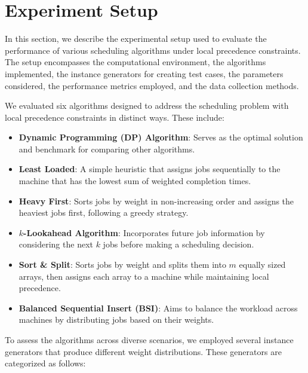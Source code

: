 \section{Experiment Setup} \label{sec:experiment_setup}

In this section, we describe the experimental setup used to evaluate the performance of various scheduling algorithms under local precedence constraints. The setup encompasses the computational environment, the algorithms implemented, the instance generators for creating test cases, the parameters considered, the performance metrics employed, and the data collection methods.

We evaluated six algorithms designed to address the scheduling problem with local precedence constraints in distinct ways. These include:

\begin{itemize}
    \item \textbf{Dynamic Programming (DP) Algorithm}: Serves as the optimal solution and benchmark for comparing other algorithms.
    \item \textbf{Least Loaded}: A simple heuristic that assigns jobs sequentially to the machine that has the lowest sum of weighted completion times.
    \item \textbf{Heavy First}: Sorts jobs by weight in non-increasing order and assigns the heaviest jobs first, following a greedy strategy.
    \item \textbf{$k$-Lookahead Algorithm}: Incorporates future job information by considering the next $k$ jobs before making a scheduling decision.
    \item \textbf{Sort \& Split}: Sorts jobs by weight and splits them into $m$ equally sized arrays, then assigns each array to a machine while maintaining local precedence.
    \item \textbf{Balanced Sequential Insert (BSI)}: Aims to balance the workload across machines by distributing jobs based on their weights.
\end{itemize}

To assess the algorithms across diverse scenarios, we employed several instance generators that produce different weight distributions. These generators are categorized as follows:

